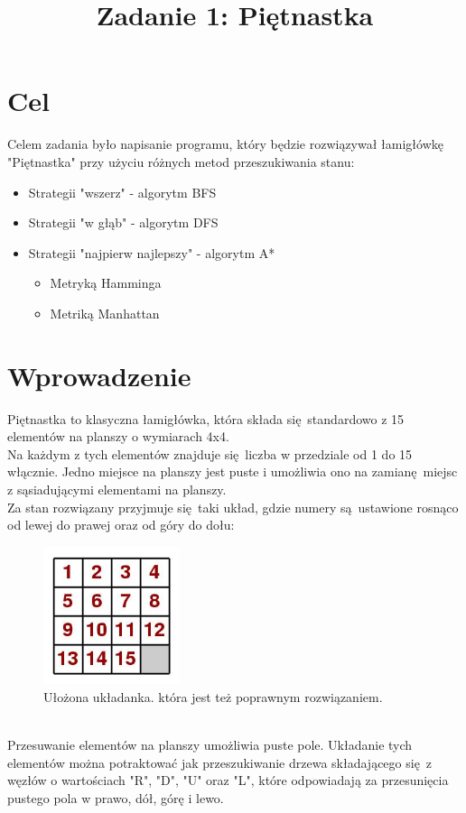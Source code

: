 \documentclass{classrep}
\author{
  \studentinfo{Grzegorz Bednarek}{242359} \and
  \studentinfo{Jędrzej Kostyk}{242430}
}
\title{Zadanie 1: Piętnastka}
\begin{document}
\maketitle
\newpage

\section{Cel}
{Celem zadania było napisanie programu, który będzie rozwiązywał łamigłówkę 
"Piętnastka" przy użyciu różnych metod przeszukiwania stanu:}
\begin{itemize}
	\item Strategii "wszerz" - algorytm BFS
	\item Strategii "w głąb" - algorytm DFS
	\item Strategii "najpierw najlepszy" - algorytm A*
	\begin{itemize}
		\item Metryką Hamminga
		\item Metriką Manhattan
	\end{itemize}
\end{itemize}
	

\section{Wprowadzenie}
Piętnastka to klasyczna łamigłówka, która składa się standardowo z 15 elementów na planszy o wymiarach 4x4.\\
Na każdym z tych elementów znajduje się liczba w przedziale od 1 do 15 włącznie.
Jedno miejsce na planszy jest puste i umożliwia ono na zamianę miejsc z sąsiadującymi elementami na planszy.\\
Za stan rozwiązany przyjmuje się taki układ, gdzie numery są ustawione rosnąco od lewej do prawej oraz od góry do dołu:
\begin{figure}[h]
	\includegraphics[width=4cm]{15grid}
	\centering
	\caption{Ułożona układanka. która jest też poprawnym rozwiązaniem.}
\end{figure}
\\
Przesuwanie elementów na planszy umożliwia puste pole. Układanie tych elementów można potraktować jak przeszukiwanie drzewa składającego się z węzłów o wartościach "R", "D", "U" oraz "L", które odpowiadają za przesunięcia pustego pola w prawo, dół, górę i lewo.
\end{document}
